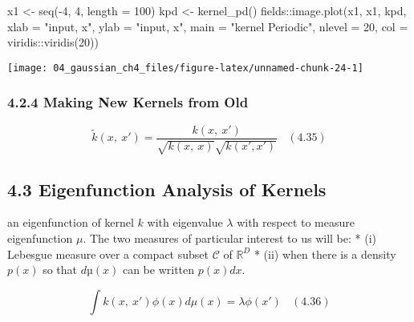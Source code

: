 \documentclass[
]{article}
\newenvironment{Shaded}{\begin{snugshade}}{\end{snugshade}}
\newcommand{\AttributeTok}[1]{\textcolor[rgb]{0.77,0.63,0.00}{#1}}
\newcommand{\DecValTok}[1]{\textcolor[rgb]{0.00,0.00,0.81}{#1}}
\newcommand{\FunctionTok}[1]{\textcolor[rgb]{0.00,0.00,0.00}{#1}}
\newcommand{\NormalTok}[1]{#1}
\newcommand{\OtherTok}[1]{\textcolor[rgb]{0.56,0.35,0.01}{#1}}
\newcommand{\SpecialCharTok}[1]{\textcolor[rgb]{0.00,0.00,0.00}{#1}}
\newcommand{\StringTok}[1]{\textcolor[rgb]{0.31,0.60,0.02}{#1}}
\begin{document}
\begin{Shaded}
\begin{Highlighting}[]
\NormalTok{x1 }\OtherTok{\textless{}{-}} \FunctionTok{seq}\NormalTok{(}\SpecialCharTok{{-}}\DecValTok{4}\NormalTok{, }\DecValTok{4}\NormalTok{, }\AttributeTok{length =} \DecValTok{100}\NormalTok{)}
\NormalTok{kpd }\OtherTok{\textless{}{-}} \FunctionTok{kernel\_pd}\NormalTok{()}
\NormalTok{fields}\SpecialCharTok{::}\FunctionTok{image.plot}\NormalTok{(x1, x1, kpd,}
                    \AttributeTok{xlab =} \StringTok{"input, x"}\NormalTok{,}
                    \AttributeTok{ylab =} \StringTok{"input, x\textquotesingle{}"}\NormalTok{,}
                    \AttributeTok{main =} \StringTok{"kernel Periodic"}\NormalTok{,}
                    \AttributeTok{nlevel =} \DecValTok{20}\NormalTok{,}
                    \AttributeTok{col =}\NormalTok{ viridis}\SpecialCharTok{::}\FunctionTok{viridis}\NormalTok{(}\DecValTok{20}\NormalTok{))}
\end{Highlighting}
\end{Shaded}

\begin{center}\texttt{[image: 04\_gaussian\_ch4\_files/figure-latex/unnamed-chunk-24-1]} \end{center}

\hypertarget{making-new-kernels-from-old}{%
\subsubsection{4.2.4 Making New Kernels from
Old}\label{making-new-kernels-from-old}}

\[
\tilde k(x,\ x') = \frac {k(x,\ x')} {\sqrt {k(x,\ x)} \sqrt{k(x', x')}}
\ \ \ \ (4.35)
\]

\hypertarget{eigenfunction-analysis-of-kernels}{%
\subsection{4.3 Eigenfunction Analysis of
Kernels}\label{eigenfunction-analysis-of-kernels}}

an eigenfunction of kernel \(k\) with eigenvalue \(\lambda\) with
respect to measure eigenfunction \(\mu\). The two measures of particular
interest to us will be: * (i) Lebesgue measure over a compact subset
\(\mathcal C\) of \(\mathbb R^D\) * (ii) when there is a density
\(p(x)\) so that \(dµ(x)\) can be written \(p(x)dx\).

\[
\int k(x,\ x')\phi(x) d\mu(x) = \lambda \phi(x')
\ \ \ \ (4.36)
\]
\end{document}
